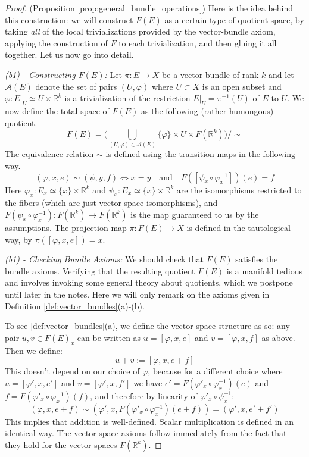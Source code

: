 \documentclass[12pt]{article}
\theoremstyle{definition}
\numberwithin{equation}{section}
\newcommand{\R}{{\mathbb R}}
\begin{document}
\begin{proof} (Proposition \ref{prop:general_bundle_operations}) Here is the idea behind this construction: we will construct $F(E)$ as a certain type of quotient space, by taking \emph{all} of the local trivializations provided by the vector-bundle axiom, applying the construction of $F$ to each trivialization, and then gluing it all together. Let us now go into detail.

\vspace{5pt}

\emph{(b1) - Constructing $F(E)$:} Let $\pi:E \to X$ be a vector bundle of rank $k$ and let $\mathcal{A}(E)$ denote the set of pairs $(U,\varphi)$ where $U \subset X$ is an open subset and $\varphi:E|_U \simeq U \times \R^k$ is a trivialization of the restriction $E|_U = \pi^{-1}(U)$ of $E$ to $U$. We now define the total space of $F(E)$ as the following (rather humongous) quotient.
\[
F(E) = \Big(\bigcup_{(U,\varphi) \in \mathcal{A}(E)} \{\varphi\} \times U \times F(\R^k) \Big)\Big/ \sim
\]
The equivalence relation $\sim$ is defined using the transition maps in the following way.
\[(\varphi,x,e) \sim (\psi,y,f) \iff x = y \quad \text{and} \quad F([\psi_x \circ \varphi_x^{-1}])(e) = f\]
Here $\varphi_x:E_x \simeq \{x\} \times \R^k$ and $\psi_x:E_x \simeq \{x\} \times \R^k$ are the isomorphisms restricted to the fibers (which are just vector-space isomorphisms), and $F(\psi_x \circ \varphi_x^{-1}):F(\R^k) \to F(\R^k)$ is the map guaranteed to us by the assumptions. The projection map $\pi:F(E) \to X$ is defined in the tautological way, by $\pi([\varphi,x,e]) = x$.

\vspace{5pt}

\emph{(b1) - Checking Bundle Axioms:} We should check that $F(E)$ satisfies the bundle axioms. Verifying that the resulting quotient $F(E)$ is a manifold tedious and involves invoking some general theory about quotients, which we postpone until later in the notes. Here we will only remark on the axioms given in Definition \ref{def:vector_bundles}(a)-(b). 

To see \ref{def:vector_bundles}(a), we define the vector-space structure as so: any pair $u,v \in F(E)_x$ can be written as $u = [\varphi,x,e]$ and $v = [\varphi,x,f]$ as above. Then we define:
\[
u + v := [\varphi, x, e + f]
\]
This doesn't depend on our choice of $\varphi$, because for a different choice where $u = [\varphi',x,e']$ and $v = [\varphi',x,f']$ we have $e' = F(\varphi'_x \circ \varphi_x^{-1})(e)$ and $f = F(\varphi'_x \circ \varphi_x^{-1})(f)$, and therefore by linearity of $\varphi'_x \circ \psi_x^{-1}$:
\[(\varphi,x,e + f) \sim (\varphi',x,F(\varphi'_x \circ \varphi_x^{-1})(e + f)) = (\varphi',x,e' + f') \]
This implies that addition is well-defined. Scalar multiplication is defined in an identical way. The vector-space axioms follow immediately from the fact that they hold for the vector-spaces $F(\R^k)$.


\end{proof}
\end{document}
